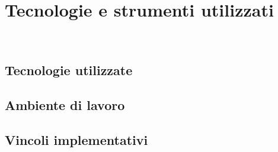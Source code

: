 \chapter{Tecnologie e strumenti utilizzati}\label{cap:Tecnologie e strumenti utilizzati}


\\

\section{Tecnologie utilizzate}

\section{Ambiente di lavoro}
\section{Vincoli implementativi}
